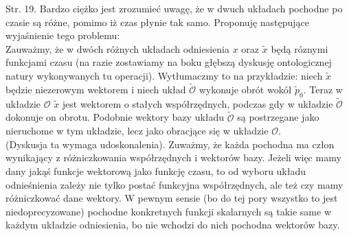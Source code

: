 \documentclass[a4paper,11pt]{article}
\begin{document}



\start {}

\start Str. 19. Bardzo ciężko jest zrozumieć uwagę, że w dwuch układach pochodne po czasie są różne, pomimo iż czas płynie tak samo. Proponuję następujące wyjaśnienie tego problemu:\\
Zauważmy, że w dwóch różnych układach odniesienia $x$ oraz
$\tilde{ x }$ będą róznymi funkcjami czasu (na razie zostawiamy na
boku głębszą dyskusję ontologicznej natury wykonywanych tu operacji).
Wytłumaczmy to na przykładzie: niech $\tilde{ x }$
będzie niezerowym wektorem i niech układ $\tilde{ \mathcal{ O } }$ wykonuje obrót wokół $\tilde{ p }_{ 0 }$. Teraz w układzie $\mathcal{ O }$ $\tilde{ x }$ jest wektorem o stałych współrzędnych, podczas gdy w układzie $\tilde{ \mathcal{ O } }$ dokonuje on obrotu. Podobnie wektory bazy układu $\tilde{ \mathcal{ O } }$ są postrzegane jako nieruchome w tym układzie, lecz jako obracjące się w układzie $\mathcal{ O }$.\\
(Dyskusja ta wymaga udoskonalenia). Zuważmy, że każda pochodna ma
człon wynikający z różniczkowania współrzędnych i wektorów bazy.
Jeżeli więc mamy dany jakąś funkcje wektorową jako funkcję czasu, to
od wyboru układu odnieśnienia zależy nie tylko postać funkcyjna
współrzędnych, ale też czy mamy różniczkować dane wektory. W pewnym
sensie (bo do tej pory wszystko to jest niedoprecyzowane) pochodne
konkretnych funkcji skalarnych są takie same w każdym układzie
odniesienia, bo nie wchodzi do nich pochodna wektorów bazy.
\end{document}
